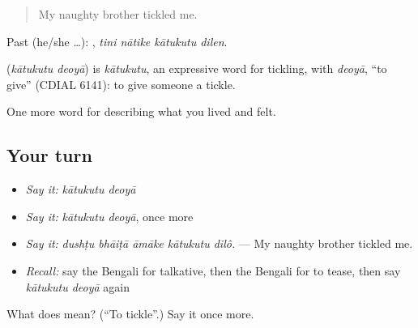 \begin{quote}
My naughty brother tickled me.
\end{quote}

Past (he/she …):    , \emph{tini nātike kātukutu dilen}.

\begin{cousinweb}
\textbf{ } (\emph{kātukutu deoyā}) is \emph{kātukutu}, an expressive word for tickling, with \emph{deoyā}, \textquotedblleft{}to give\textquotedblright{} (CDIAL 6141): to give someone a tickle.
\end{cousinweb}

\begin{grammarlens}[title={What you've built}]
One more word for describing what you lived and felt.
\end{grammarlens}

\subsection*{Your turn}
\begin{itemize}
\raggedright
  \item \emph{Say it:} \emph{kātukutu deoyā}
  \item \emph{Say it:} \emph{kātukutu deoyā}, once more
  \item \emph{Say it:} \emph{dushṭu bhāiṭā āmāke kātukutu dilô.} — My naughty brother tickled me.
  \item \emph{Recall:} say the Bengali for talkative, then the Bengali for to tease, then say \emph{kātukutu deoyā} again
\end{itemize}

\begin{tcolorbox}[breakable,colback=teal!4,colframe=teal!35!black,title={Before you move on}]
What does   mean? (\textquotedblleft{}To tickle\textquotedblright{}.) Say it once more.
\end{tcolorbox}
